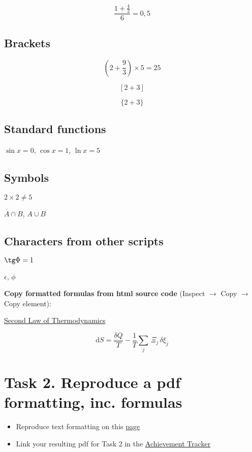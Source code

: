 \documentclass[a4paper,11pt]{article}
\begin{document}
\[\frac{1+\frac{4}{2}}{6} = 0,5\]

\subsection{Brackets}

\[ \left(2+\frac{9}{3}\right) \times 5 = 25 \]

\[  [2+3]  \]

\[ \{2+3\}  \]

\subsection{Standard functions}

$\sin x = 0$, $\cos x = 1$, $\ln x = 5$

\subsection{Symbols}

$2\times 2 \ne 5$

$A \cap B$, $A \cup B$

\subsection{Characters from other scripts}

$\tg \Phi = 1$

$\epsilon$, $\phi$

\bigskip


\textbf{{\color{red}Copy formatted formulas from html source code}} (Inspect $\rightarrow$ Copy $\rightarrow$ Copy element):

 \href{https://en.wikipedia.org/wiki/Second_law_of_thermodynamics}{Second Law of Thermodynamics}
 
\[\mathrm {d} S={\frac {\delta Q}{T}}-{\frac {1}{T}}\sum _{j}\,\Xi _{j}\,\delta \xi _{j}\]



\section*{Task 2. Reproduce a pdf formatting, inc. formulas}
\label{task}

\begin{tcolorbox}[width=\textwidth, colback={yellow!40!white}, title={}, colbacktitle=yellow!60!white, coltitle=black]
	\begin{itemize}
		\item Reproduce text formatting on this \href{https://github.com/kunilovskaya/dskills_workshop/blob/main/w1_latex_basics/s2/practice2.pdf}{page}
		\item Link your resulting pdf for Task 2 in the \href{https://docs.google.com/document/d/17ZBAQGBKIlO6JMwxz3LlghYq1sdsUjhHVXga46BK0kg/edit?usp=sharing}{Achievement Tracker}
	\end{itemize}
	
\end{tcolorbox}%
\end{document}
